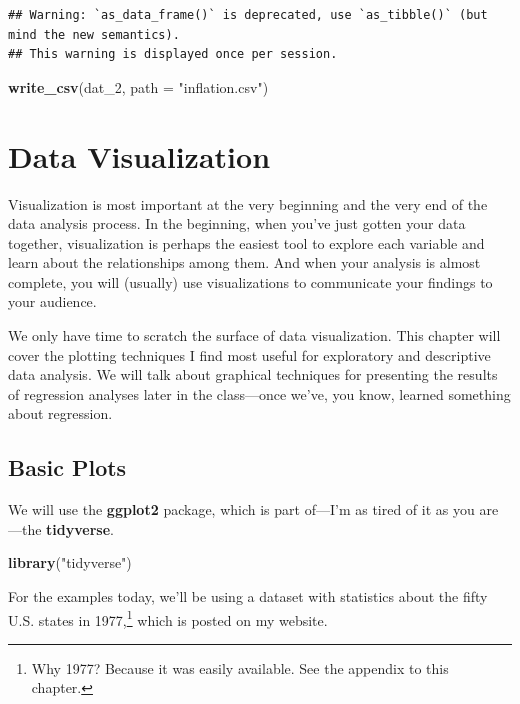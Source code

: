 \documentclass[12pt,oneside,openany]{book}
\newenvironment{Shaded}{\begin{snugshade}}{\end{snugshade}}
\newcommand{\KeywordTok}[1]{\textcolor[rgb]{0.13,0.29,0.53}{\textbf{#1}}}
\newcommand{\DataTypeTok}[1]{\textcolor[rgb]{0.13,0.29,0.53}{#1}}
\newcommand{\DecValTok}[1]{\textcolor[rgb]{0.00,0.00,0.81}{#1}}
\newcommand{\StringTok}[1]{\textcolor[rgb]{0.31,0.60,0.02}{#1}}
\newcommand{\NormalTok}[1]{#1}
\begin{document}
\begin{verbatim}
## Warning: `as_data_frame()` is deprecated, use `as_tibble()` (but mind the new semantics).
## This warning is displayed once per session.
\end{verbatim}

\begin{Shaded}
\begin{Highlighting}[]
\KeywordTok{write_csv}\NormalTok{(dat_}\DecValTok{2}\NormalTok{, }\DataTypeTok{path =} \StringTok{"inflation.csv"}\NormalTok{)}
\end{Highlighting}
\end{Shaded}

\chapter{Data Visualization}\label{visualization}

Visualization is most important at the very beginning and the very end
of the data analysis process. In the beginning, when you've just gotten
your data together, visualization is perhaps the easiest tool to explore
each variable and learn about the relationships among them. And when
your analysis is almost complete, you will (usually) use visualizations
to communicate your findings to your audience.

We only have time to scratch the surface of data visualization. This
chapter will cover the plotting techniques I find most useful for
exploratory and descriptive data analysis. We will talk about graphical
techniques for presenting the results of regression analyses later in
the class---once we've, you know, learned something about regression.

\section{Basic Plots}\label{basic-plots}

We will use the \textbf{ggplot2} package, which is part of---I'm as
tired of it as you are---the \textbf{tidyverse}.

\begin{Shaded}
\begin{Highlighting}[]
\KeywordTok{library}\NormalTok{(}\StringTok{"tidyverse"}\NormalTok{)}
\end{Highlighting}
\end{Shaded}

For the examples today, we'll be using a dataset with statistics about
the fifty U.S. states in 1977,\footnote{Why 1977? Because it was easily
  available. See the appendix to this chapter.} which is posted on my
website.
\end{document}
